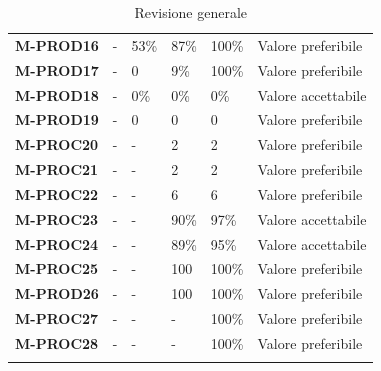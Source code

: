 \begin{longtable} {						
		>{}p{30mm}  		
		>{}p{10mm}		
		>{}p{15mm}		
		>{}p{15mm}		
		>{}p{15mm}
		>{}p{45mm}							
	}
	\textbf{M-PROD16} & -  & 53\%       & 87\%       & 100\%      & Valore preferibile\TBstrut \\ [2mm]
	\textbf{M-PROD17} & -  & 0          & 9\%        & 100\%      & Valore preferibile\TBstrut \\ [2mm]
	\textbf{M-PROD18} & -  & 0\%        & 0\%        & 0\%        & Valore accettabile\TBstrut \\ [2mm]
	\textbf{M-PROD19} & -  & 0          & 0          & 0          & Valore preferibile\TBstrut \\ [2mm]
	\textbf{M-PROC20} & -  & -          & 2          & 2          & Valore preferibile \TBstrut \\ [2mm]
	\textbf{M-PROC21} & -  & -          & 2          & 2          & Valore preferibile\TBstrut \\ [2mm]
	\textbf{M-PROC22} & -  & -          & 6          & 6          & Valore preferibile\TBstrut \\ [2mm]
	\textbf{M-PROC23} & -  & -          & 90\%       & 97\%       & Valore accettabile\TBstrut \\ [2mm]
	\textbf{M-PROC24} & -  & -          & 89\%       & 95\%       & Valore accettabile\TBstrut \\ [2mm]
	\textbf{M-PROC25} & -  & -          & 100        & 100\%      & Valore preferibile\TBstrut \\ [2mm]
	\textbf{M-PROD26} & -  & -          & 100        & 100\%      & Valore preferibile\TBstrut \\ [2mm]
	\textbf{M-PROC27} & -  & -          & -          & 100\%      & Valore preferibile\TBstrut \\ [2mm]
	\textbf{M-PROC28} & -  & -          & -          & 100\%      & Valore preferibile\TBstrut \\ [2mm]
	\rowcolor{white}
	\caption{Revisione generale}
\end{longtable}
